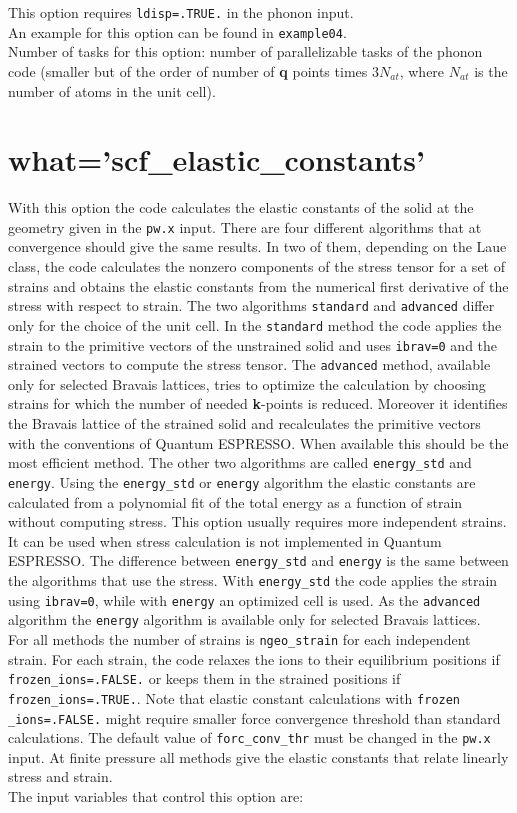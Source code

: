 \documentclass[12pt,a4paper,twoside]{report}
\def\qe{{\sc Quantum ESPRESSO}}
\begin{document}
This option requires \texttt{ldisp=.TRUE.} in the phonon input. \\
An example for this option can be found in \texttt{example04}. \\
Number of tasks for this option: number of parallelizable tasks of the 
phonon code (smaller but of the order of number of {\bf q} points times 
$3 N_{at}$, where $N_{at}$ is the number of atoms in the unit cell).

\newpage
{\color{coral}\section{what='scf\_elastic\_constants'}}
\color{black}
With this option the code calculates the elastic constants of the solid
at the geometry given in the \texttt{pw.x} input. 
There are four different algorithms that at convergence should give the
same results. In two of them, depending on the Laue class, the code 
calculates the nonzero components of the stress tensor for a set of strains
and obtains the elastic constants from the numerical first derivative
of the stress with respect to strain.
The two algorithms \texttt{standard} and \texttt{advanced} differ
only for the choice of the unit cell. In the \texttt{standard} method the
code applies the strain to the primitive vectors of the unstrained solid
and uses \texttt{ibrav=0} and the strained vectors to compute the stress
tensor.
The \texttt{advanced} method, available only for selected Bravais lattices, 
tries to optimize the calculation by choosing strains for which the number
of needed {\bf k}-points is reduced. Moreover it identifies the 
Bravais lattice of the strained solid and recalculates the primitive
vectors with the conventions of \qe. When available this should be the
most efficient method.
The other two algorithms are called \texttt{energy\_std} and \texttt{energy}.
Using the \texttt{energy\_std} or \texttt{energy} algorithm the elastic 
constants are calculated 
from a polynomial fit of the total energy as a function of strain 
without computing stress. This option usually requires more independent 
strains. It can be used when stress calculation is not implemented in \qe.
The difference between \texttt{energy\_std} and \texttt{energy} is 
the same between the algorithms that use the stress. With
\texttt{energy\_std} the code applies the strain using \texttt{ibrav=0},
while with \texttt{energy} an optimized cell is used. As the
\texttt{advanced} algorithm the \texttt{energy} algorithm is available
only for selected Bravais lattices.\\
For all methods the number of strains is \texttt{ngeo\_strain}
for each independent strain. 
For each strain, the code relaxes the ions to their equilibrium 
positions if \texttt{frozen\_ions=.FALSE.} or keeps them
in the strained positions if \texttt{frozen\_ions=.TRUE.}. 
Note that elastic constant calculations with \texttt{frozen}
\texttt{\_ions=.FALSE.}
might require smaller force convergence threshold than standard calculations. 
The default value of \texttt{forc\_conv\_thr} must be changed in the 
\texttt{pw.x} input.
At finite pressure all methods give the elastic constants that
relate linearly stress and strain. \\
The input variables that control this option are:
\end{document}
